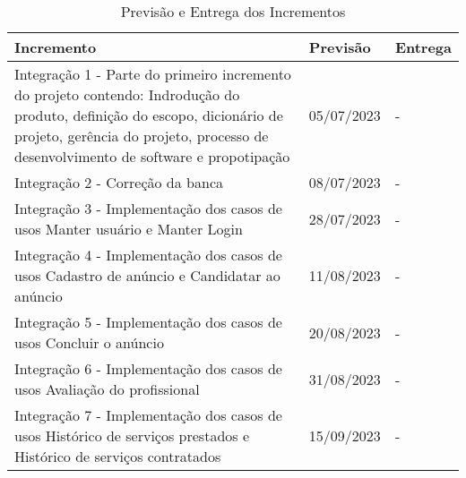 \begin{table}[htb]
    \centering
    \caption{Previsão e Entrega dos Incrementos}
    \label{tab:previsao-entrega-incrementos}
    \begin{tabular}{|p{8cm}|p{2cm}|p{2cm}|}
    \hline
    \textbf{Incremento} & \textbf{Previsão} & \textbf{Entrega}  \\ \hline
    Integração 1 - Parte do primeiro incremento do projeto contendo: Indrodução do produto, definição do escopo, dicionário de projeto, gerência do projeto, processo de desenvolvimento de software e propotipação & 05/07/2023 & -  \\ \hline
    Integração 2 - Correção da banca & 08/07/2023 & - \\ \hline
    Integração 3 - Implementação dos casos de usos Manter usuário e Manter Login & 28/07/2023 & - \\ \hline
    Integração 4 - Implementação dos casos de usos Cadastro de anúncio e Candidatar ao anúncio & 11/08/2023 & - \\ \hline
    Integração 5 - Implementação dos casos de usos Concluir o anúncio & 20/08/2023 & - \\ \hline
    Integração 6 - Implementação dos casos de usos Avaliação do profissional & 31/08/2023 & - \\ \hline
    Integração 7 - Implementação dos casos de usos Histórico de serviços prestados e Histórico de serviços contratados & 15/09/2023 & - \\ \hline
    \end{tabular}
\end{table}
    
    
    